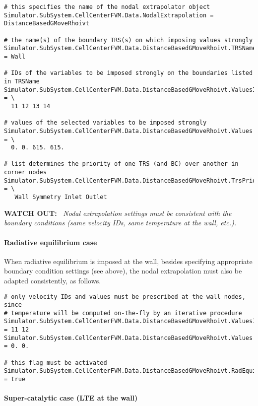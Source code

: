 \documentclass[11pt]{article}
\begin{document}
\begin{verbatim}
# this specifies the name of the nodal extrapolator object
Simulator.SubSystem.CellCenterFVM.Data.NodalExtrapolation = DistanceBasedGMoveRhoivt

# the name(s) of the boundary TRS(s) on which imposing values strongly 
Simulator.SubSystem.CellCenterFVM.Data.DistanceBasedGMoveRhoivt.TRSName = Wall

# IDs of the variables to be imposed strongly on the boundaries listed in TRSName
Simulator.SubSystem.CellCenterFVM.Data.DistanceBasedGMoveRhoivt.ValuesIdx = \
  11 12 13 14

# values of the selected variables to be imposed strongly
Simulator.SubSystem.CellCenterFVM.Data.DistanceBasedGMoveRhoivt.Values = \
  0. 0. 615. 615.

# list determines the priority of one TRS (and BC) over another in corner nodes
Simulator.SubSystem.CellCenterFVM.Data.DistanceBasedGMoveRhoivt.TrsPriorityList = \
   Wall Symmetry Inlet Outlet
\end{verbatim}

{\bf WATCH OUT:~} {\it Nodal extrapolation settings must be consistent with the boundary conditions (same velocity IDs, same temperature at the wall, etc.).}

\paragraph{Radiative equilibrium case}

When radiative equilibrium is imposed at the wall, besides specifying appropriate boundary condition settings (see above),
the nodal extrapolation must also be adapted consistently, as follows.

\begin{verbatim}
# only velocity IDs and values must be prescribed at the wall nodes, since 
# temperature will be computed on-the-fly by an iterative procedure  
Simulator.SubSystem.CellCenterFVM.Data.DistanceBasedGMoveRhoivt.ValuesIdx = 11 12 
Simulator.SubSystem.CellCenterFVM.Data.DistanceBasedGMoveRhoivt.Values = 0. 0.

# this flag must be activated
Simulator.SubSystem.CellCenterFVM.Data.DistanceBasedGMoveRhoivt.RadEquilibrium = true
\end{verbatim}

\paragraph{Super-catalytic case (LTE at the wall)}
\end{document}
